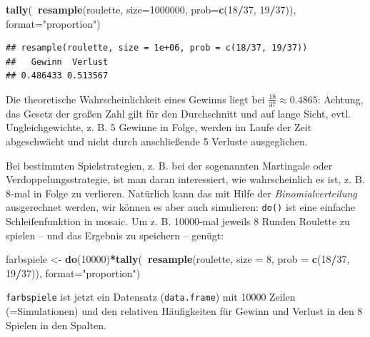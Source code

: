 \documentclass[12pt,ngerman,paper=a4,pagesize,DIV=13]{scrreprt}
\newenvironment{Shaded}{\begin{snugshade}}{\end{snugshade}}
\newcommand{\DataTypeTok}[1]{\textcolor[rgb]{0.13,0.29,0.53}{#1}}
\newcommand{\DecValTok}[1]{\textcolor[rgb]{0.00,0.00,0.81}{#1}}
\newcommand{\KeywordTok}[1]{\textcolor[rgb]{0.13,0.29,0.53}{\textbf{#1}}}
\newcommand{\NormalTok}[1]{#1}
\newcommand{\OperatorTok}[1]{\textcolor[rgb]{0.81,0.36,0.00}{\textbf{#1}}}
\newcommand{\StringTok}[1]{\textcolor[rgb]{0.31,0.60,0.02}{#1}}
\begin{document}
\begin{Shaded}
\begin{Highlighting}[]
\KeywordTok{tally}\NormalTok{(}\OperatorTok{~}\KeywordTok{resample}\NormalTok{(roulette, }\DataTypeTok{size=}\DecValTok{1000000}\NormalTok{, }\DataTypeTok{prob=}\KeywordTok{c}\NormalTok{(}\DecValTok{18}\OperatorTok{/}\DecValTok{37}\NormalTok{, }\DecValTok{19}\OperatorTok{/}\DecValTok{37}\NormalTok{)), }\DataTypeTok{format=}\StringTok{"proportion"}\NormalTok{)}
\end{Highlighting}
\end{Shaded}

\begin{verbatim}
## resample(roulette, size = 1e+06, prob = c(18/37, 19/37))
##   Gewinn  Verlust 
## 0.486433 0.513567
\end{verbatim}

Die theoretische Wahrscheinlichkeit eines Gewinns liegt bei
\(\frac{18}{37} \approx 0.4865\): Achtung, das Gesetz der großen Zahl
gilt für den Durchschnitt und auf lange Sicht, evtl. Ungleichgewichte,
z. B. 5 Gewinne in Folge, werden im Laufe der Zeit abgeschwächt und
nicht durch anschließende 5 Verluste ausgeglichen.

Bei bestimmten Spielstrategien, z. B. bei der sogenannten Martingale
oder Verdoppelungsstrategie, ist man daran interessiert, wie
wahrscheinlich es ist, z. B. 8-mal in Folge zu verlieren. Natürlich kann
das mit Hilfe der \emph{Binomialverteilung} ausgerechnet werden, wir
können es aber auch simulieren: \texttt{do()} ist eine einfache
Schleifenfunktion in mosaic. Um z. B. 10000-mal jeweils 8 Runden
Roulette zu spielen -- und das Ergebnis zu speichern -- genügt:

\begin{Shaded}
\begin{Highlighting}[]
\NormalTok{farbspiele <-}\StringTok{ }\KeywordTok{do}\NormalTok{(}\DecValTok{10000}\NormalTok{)}\OperatorTok{*}\KeywordTok{tally}\NormalTok{(}\OperatorTok{~}\KeywordTok{resample}\NormalTok{(roulette, }\DataTypeTok{size =} \DecValTok{8}\NormalTok{, }
                  \DataTypeTok{prob =} \KeywordTok{c}\NormalTok{(}\DecValTok{18}\OperatorTok{/}\DecValTok{37}\NormalTok{, }\DecValTok{19}\OperatorTok{/}\DecValTok{37}\NormalTok{)), }\DataTypeTok{format=}\StringTok{"proportion"}\NormalTok{)}
\end{Highlighting}
\end{Shaded}

\texttt{farbspiele} ist jetzt ein Datensatz (\texttt{data.frame}) mit
10000 Zeilen (=Simulationen) und den relativen Häufigkeiten für Gewinn
und Verlust in den 8 Spielen in den Spalten.
\end{document}
